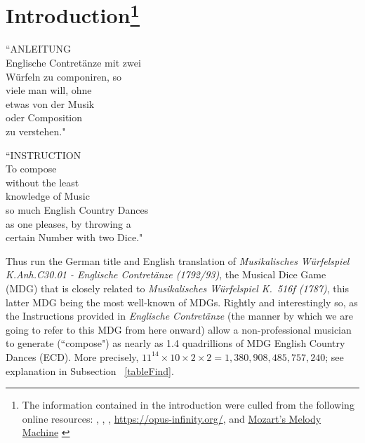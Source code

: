\documentclass[letterpaper,x11names,svgnames,10pt]{article}
\begin{document}
\section[Introduction]{Introduction\footnote{The information contained in the introduction were culled from the following online resources:
	\citet{wiki_mw2017}, \citet{wam92}, \citet{kv2024}, 
	\url{https://opus-infinity.org/}, and 
	\href{https://www.sciencenews.org/article/mozarts-melody-machine-0}{Mozart's Melody Machine} \citep*{peterson2001}
	}
}
	\begin{center}
	\begin{minipage}{0.4\textwidth}
	\begin{flushleft}
		\begin{center}
			``ANLEITUNG\\
			Englische Contret\"{a}nze mit zwei\\
			W\"{u}rfeln zu componiren, so\\
			viele man will, ohne\\
			etwas von der Musik\\
			oder Composition\\
			zu verstehen."\\
		\end{center}
	\end{flushleft}
	\end{minipage}
	\begin{minipage}{0.4\textwidth}
	\begin{flushright}
		\begin{center}
		``INSTRUCTION\\
		To compose \\
		without the least \\ 
		knowledge of Music \\ 
		so much English Country Dances \\
		as one pleases, by throwing a \\
		certain Number with two Dice."
	\end{center}
	\end{flushright}
	\end{minipage}
	\end{center}

Thus run the German title and English translation of {\it Musikalisches W\"{u}rfelspiel K.Anh.C30.01 - Englische Contret\"{a}nze (1792/93)}, the Musical Dice Game (MDG) that is closely related to {\it Musikalisches W\"{u}rfelspiel K.\ 516f (1787)}, this latter MDG being the most well-known of MDGs.  Rightly and interestingly so, as the Instructions provided in {\it Englische Contret\"{a}nze} (the manner by which we are going to refer to this MDG from here onward) allow a non-professional musician to generate (``compose") as nearly as 1.4 quadrillions of MDG English Country Dances (ECD).  More precisely, $11^{14}\times 10 \times 2\times 2 = 1\!,380\!,908\!,485\!,757\!,240$; see explanation in Subsection ~\ref{tableFind}.\\  
\end{document}
